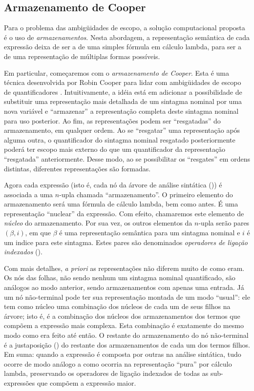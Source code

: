 \subsection{Armazenamento de Cooper}

Para o problema das ambigüidades de escopo, a solução computacional proposta é o uso de \textit{armazenamentos}. Nesta abordagem, a representação semântica de cada expressão deixa de ser a de uma simples fórmula em cálculo lambda, para ser a de uma representação de múltiplas formas possíveis.

Em particular, começaremos com o \textit{armazenamento de Cooper}. Esta é uma técnica desenvolvida por Robin Cooper para lidar com ambigüidades de escopo de quantificadores \cite[p.~113]{BlackburnBos:2005}. Intuitivamente, a idéia está em adicionar a possibilidade de substituir uma representação mais detalhada de um sintagma nominal por uma nova variável e ``armazenar'' a representação completa deste sintagma nominal para uso posterior. Ao fim, as representações podem ser ``resgatadas'' do armazenamento, em qualquer ordem. Ao se ``resgatar'' uma representação após alguma outra, o quantificador do sintagma nominal resgatado posteriormente poderá ter escopo mais externo do que um quantificador da representação ``resgatada'' anteriormente. Desse modo, ao se possibilitar os ``resgates'' em ordens distintas, diferentes representações são formadas.

Agora cada expressão (isto é, cada nó da árvore de análise sintática ()) é associada a uma $n$-upla chamada ``armazenamento''. O primeiro elemento do armazenamento será uma fórmula de cálculo lambda, bem como antes. É uma representação ``nuclear'' da expressão. Com efeito, chamaremos este elemento de \textit{núcleo} do armazenamento. Por sua vez, os outros elementos da $n$-upla serão pares $(\beta, i)$, em que $\beta$ é uma representação semântica para um sintagma nominal e $i$ é um indice para este sintagma. Estes pares são denominados \textit{operadores de ligação indexados} ().

Com mais detalhes, \textit{a priori} as representações não diferem muito de como eram. Os nós das folhas, não sendo nenhum um sintagma nominal quantificado, são análogos ao modo anterior, sendo armazenamentos com apenas uma entrada. Já um nó não-terminal pode ter sua representação montada de um modo ``usual'': ele tem como núcleo uma combinação dos núcleos de cada um de seus filhos na árvore; isto é, é a combinação dos núcleos dos armazenamentos dos termos que compõem a expressão mais complexa. Esta combinação é exatamente do mesmo modo como era feito até então. O restante do armazenamento do nó não-terminal é a justaposição () do restante dos armazenamentos de cada um dos termos filhos. Em suma: quando a expressão é composta por outras na análise sintática, tudo ocorre de modo análogo a como ocorria na representação ``pura'' por cálculo lambda, preservando os operadores de ligação indexados de todas as sub-expressões que compõem a expressão maior.

